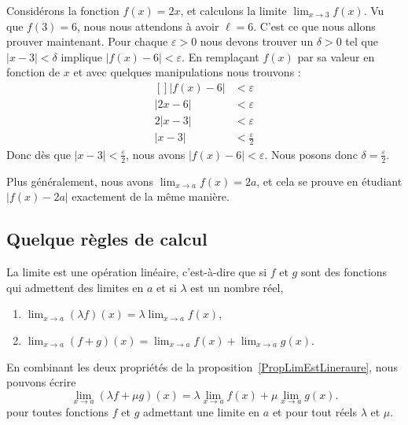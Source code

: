 \begin{example}
	Considérons la fonction $f(x)=2x$, et calculons la limite $\lim_{x\to 3} f(x)$. Vu que $f(3)=6$, nous nous attendons à avoir $\ell=6$. C'est ce que nous allons prouver maintenant. Pour chaque $\varepsilon>0$ nous devons trouver un $\delta>0$ tel que $| x-3 |<\delta$ implique $| f(x)-6 |<\varepsilon$. En remplaçant $f(x)$ par sa valeur en fonction de $x$ et avec quelques manipulations nous trouvons :
	\begin{equation}
		\begin{aligned}[]
			| f(x)-6 |&<\varepsilon\\
			| 2x-6 |&<\varepsilon\\
			2| x-3 |&<\varepsilon\\
			| x-3 |&<\frac{ \varepsilon }{2}
		\end{aligned}
	\end{equation}
	Donc dès que $| x-3 |<\frac{ \varepsilon }{2}$, nous avons $| f(x)-6 |<\varepsilon$. Nous posons donc $\delta=\frac{ \varepsilon }{2}$.

	Plus généralement, nous avons $\lim_{x\to a} f(x)=2a$, et cela se prouve en étudiant $| f(x)-2a |$ exactement de la même manière.
\end{example}

\subsection{Quelque règles de calcul}

\begin{proposition}	\label{PropLimEstLineraure}
	La limite est une opération linéaire, c'est-à-dire que si $f$ et $g$ sont des fonctions qui admettent des limites en $a$ et si $\lambda$ est un nombre réel,
	\begin{enumerate}

		\item
			$\lim_{x\to a} (\lambda f)(x)=\lambda\lim_{x\to a} f(x)$,
		\item
			$\lim_{x\to a} (f+g)(x)=\lim_{x\to a} f(x)+\lim_{x\to a} g(x)$.
	\end{enumerate}
\end{proposition}
En combinant les deux propriétés de la proposition~\ref{PropLimEstLineraure}, nous pouvons écrire
\begin{equation}
	\lim_{x\to a} (\lambda f+\mu g)(x)=\lambda\lim_{x\to a} f(x)+\mu\lim_{x\to a} g(x).
\end{equation}
pour toutes fonctions $f$ et $g$ admettant une limite en $a$ et pour tout réels $\lambda$ et $\mu$.

